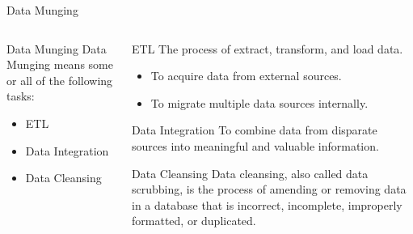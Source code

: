 \documentclass[10pt]{beamer}
\begin{document}
   \begin{frame}{Data Munging}
     \begin{columns}
       \begin{column}[T]{0.48\textwidth}
         \begin{block}{Data Munging}
          Data Munging means some or all of the following tasks:
          \smallskip
           \begin{itemize}
             \item<1-> \alert<2>{ETL}
             \smallskip
             \item<1-> \alert<3>{Data Integration}
             \smallskip
             \item<1-> \alert<4>{Data Cleansing}
           \end{itemize}
         \end{block}
       \end{column}
       \begin{column}[T]{0.48\textwidth}
         \begin{overprint}
             \begin{alertblock}{ETL}
               The process of extract, transform, and load data.
               \smallskip
                 \begin{itemize}
                   \item To acquire data from external sources. 
                   \smallskip
                   \item To migrate multiple data sources internally.
                 \end{itemize}
             \end{alertblock}
             \begin{alertblock}{Data Integration}
               To combine data from disparate sources into meaningful and valuable information.
             \end{alertblock}
             \begin{alertblock}{Data Cleansing}
               Data cleansing, also called data scrubbing, is the process of amending or removing data in a database that is incorrect, incomplete, improperly formatted, or duplicated.
             \end{alertblock}
         \end{overprint}
       \end{column}   
     \end{columns}
   \end{frame}
\end{document}
